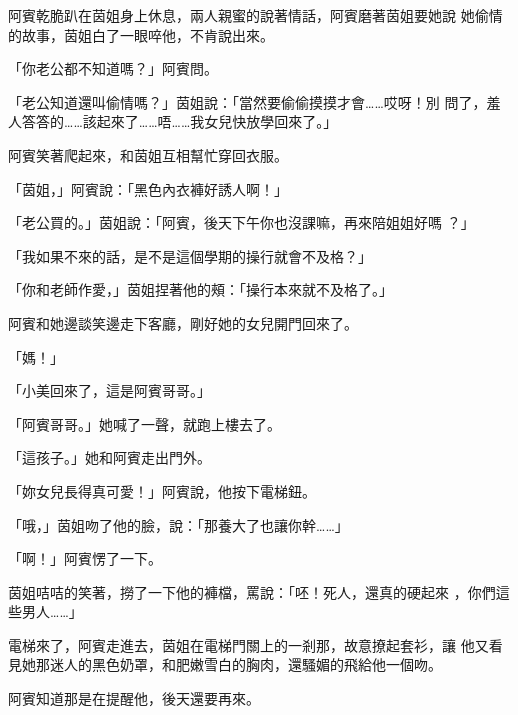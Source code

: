阿賓乾脆趴在茵姐身上休息，兩人親蜜的說著情話，阿賓磨著茵姐要她說
她偷情的故事，茵姐白了一眼啐他，不肯說出來。

「你老公都不知道嗎？」阿賓問。

「老公知道還叫偷情嗎？」茵姐說：「當然要偷偷摸摸才會……哎呀！別
問了，羞人答答的……該起來了……唔……我女兒快放學回來了。」

阿賓笑著爬起來，和茵姐互相幫忙穿回衣服。

「茵姐，」阿賓說：「黑色內衣褲好誘人啊！」

「老公買的。」茵姐說：「阿賓，後天下午你也沒課嘛，再來陪姐姐好嗎
？」

「我如果不來的話，是不是這個學期的操行就會不及格？」

「你和老師作愛，」茵姐捏著他的頰：「操行本來就不及格了。」

阿賓和她邊談笑邊走下客廳，剛好她的女兒開門回來了。

「媽！」

「小美回來了，這是阿賓哥哥。」

「阿賓哥哥。」她喊了一聲，就跑上樓去了。

「這孩子。」她和阿賓走出門外。

「妳女兒長得真可愛！」阿賓說，他按下電梯鈕。

「哦，」茵姐吻了他的臉，說：「那養大了也讓你幹……」

「啊！」阿賓愣了一下。

茵姐咭咭的笑著，撈了一下他的褲檔，罵說：「呸！死人，還真的硬起來
，你們這些男人……」

電梯來了，阿賓走進去，茵姐在電梯門關上的一剎那，故意撩起套衫，讓
他又看見她那迷人的黑色奶罩，和肥嫩雪白的胸肉，還騷媚的飛給他一個吻。

阿賓知道那是在提醒他，後天還要再來。










